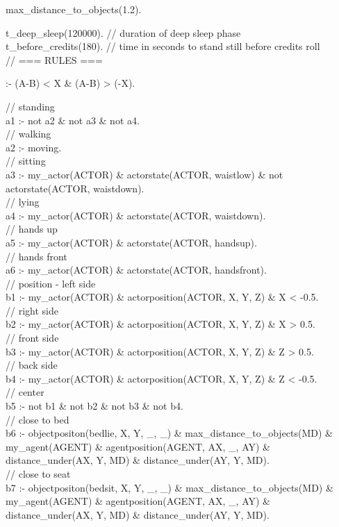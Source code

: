 \documentclass[draft,final]{vutinfth} %
\begin{document}
{max\_distance\_to\_objects(1.2).

t\_deep\_sleep(120000).    // duration of deep sleep phase\\

t\_before\_credits(180).  // time in seconds to stand still before credits roll\\

// === RULES ===

    :- (A-B) < X \& (A-B) > (-X).

// standing\\
a1 :- not a2 \& not a3 \& not a4.     \\          
// walking\\
a2 :- moving.     \\                             
// sitting\\
a3 :- my\_actor(ACTOR) \& actorstate(ACTOR, waistlow) \& not actorstate(ACTOR, waistdown).\\
// lying\\
a4 :- my\_actor(ACTOR) \& actorstate(ACTOR, waistdown).\\
// hands up\\
a5 :- my\_actor(ACTOR) \& actorstate(ACTOR, handsup).\\
// hands front\\
a6 :- my\_actor(ACTOR) \& actorstate(ACTOR, handsfront).\\

// position - left side\\
b1 :- my\_actor(ACTOR) \& actorposition(ACTOR, X, Y, Z) \& X < -0.5.\\
// right side\\
b2 :- my\_actor(ACTOR) \& actorposition(ACTOR, X, Y, Z) \& X > 0.5.\\
// front side\\
b3 :- my\_actor(ACTOR) \& actorposition(ACTOR, X, Y, Z) \& Z > 0.5.\\
// back side\\
b4 :- my\_actor(ACTOR) \& actorposition(ACTOR, X, Y, Z) \& Z < -0.5.\\
// center\\
b5 :- not b1 \& not b2 \& not b3 \& not b4.\\
// close to bed\\
b6 :- objectpositon(bedlie, X, Y, \_, \_) \& max\_distance\_to\_objects(MD) \& my\_agent(AGENT) \& agentposition(AGENT, AX, \_, AY)
        \& distance\_under(AX, Y, MD) \& distance\_under(AY, Y, MD).\\
// close to seat\\
b7 :- objectpositon(bedsit, X, Y, \_, \_) \& max\_distance\_to\_objects(MD) \& my\_agent(AGENT) \& agentposition(AGENT, AX, \_, AY)
        \& distance\_under(AX, Y, MD) \& distance\_under(AY, Y, MD).

}
\end{document}
